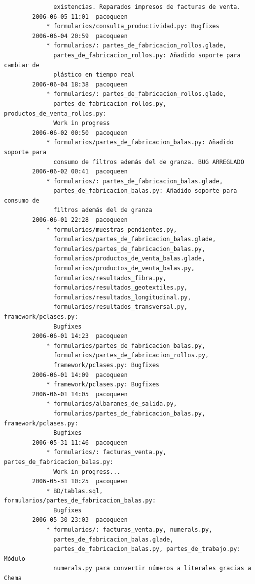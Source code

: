 \documentclass[a4paper]{article}
\begin{document}
\begin{verbatim}
              existencias. Reparados impresos de facturas de venta.
        2006-06-05 11:01  pacoqueen
            * formularios/consulta_productividad.py: Bugfixes
        2006-06-04 20:59  pacoqueen
            * formularios/: partes_de_fabricacion_rollos.glade,
              partes_de_fabricacion_rollos.py: Añadido soporte para cambiar de
              plástico en tiempo real
        2006-06-04 18:38  pacoqueen
            * formularios/: partes_de_fabricacion_rollos.glade,
              partes_de_fabricacion_rollos.py, productos_de_venta_rollos.py:
              Work in progress
        2006-06-02 00:50  pacoqueen
            * formularios/partes_de_fabricacion_balas.py: Añadido soporte para
              consumo de filtros además del de granza. BUG ARREGLADO
        2006-06-02 00:41  pacoqueen
            * formularios/: partes_de_fabricacion_balas.glade,
              partes_de_fabricacion_balas.py: Añadido soporte para consumo de
              filtros además del de granza
        2006-06-01 22:28  pacoqueen
            * formularios/muestras_pendientes.py,
              formularios/partes_de_fabricacion_balas.glade,
              formularios/partes_de_fabricacion_balas.py,
              formularios/productos_de_venta_balas.glade,
              formularios/productos_de_venta_balas.py,
              formularios/resultados_fibra.py,
              formularios/resultados_geotextiles.py,
              formularios/resultados_longitudinal.py,
              formularios/resultados_transversal.py, framework/pclases.py:
              Bugfixes
        2006-06-01 14:23  pacoqueen
            * formularios/partes_de_fabricacion_balas.py,
              formularios/partes_de_fabricacion_rollos.py,
              framework/pclases.py: Bugfixes
        2006-06-01 14:09  pacoqueen
            * framework/pclases.py: Bugfixes
        2006-06-01 14:05  pacoqueen
            * formularios/albaranes_de_salida.py,
              formularios/partes_de_fabricacion_balas.py, framework/pclases.py:
              Bugfixes
        2006-05-31 11:46  pacoqueen
            * formularios/: facturas_venta.py, partes_de_fabricacion_balas.py:
              Work in progress...
        2006-05-31 10:25  pacoqueen
            * BD/tablas.sql, formularios/partes_de_fabricacion_balas.py:
              Bugfixes
        2006-05-30 23:03  pacoqueen
            * formularios/: facturas_venta.py, numerals.py,
              partes_de_fabricacion_balas.glade,
              partes_de_fabricacion_balas.py, partes_de_trabajo.py: Módulo
              numerals.py para convertir números a literales gracias a Chema

\end{verbatim}
\end{document}
